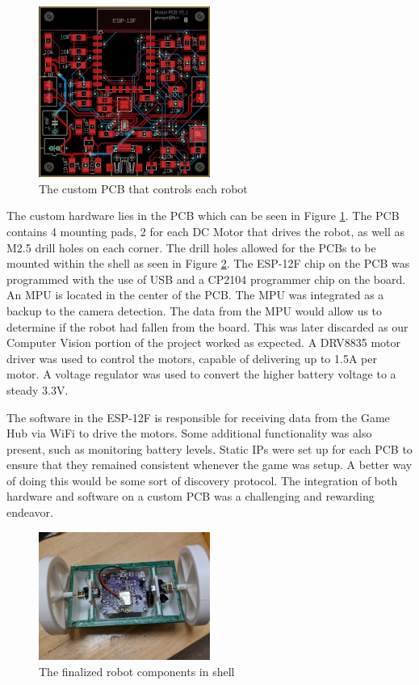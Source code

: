 \documentclass[11pt]{ieeeconf}
\begin{document}
\begin{figure}[H]
\centering
\captionsetup{justification=centering}
\includegraphics[width=0.5\textwidth]{images/FinalPCB.jpg}
\caption{The custom PCB that controls each robot}
\label{PCB}
\end{figure}

The custom hardware lies in the PCB which can be seen in Figure \ref{PCB}. The PCB contains 4 mounting pads, 2 for each DC Motor that drives the robot, as well as M2.5 drill holes on each corner. The drill holes allowed for the PCBs to be mounted within the shell as seen in Figure \ref{robot}. The ESP-12F chip on the PCB was programmed with the use of USB and a CP2104 programmer chip on the board. An MPU is located in the center of the PCB. The MPU was integrated as a backup to the camera detection. The data from the MPU would allow us to determine if the robot had fallen from the board. This was later discarded as our Computer Vision portion of the project worked as expected. A DRV8835 motor driver was used to control the motors, capable of delivering up to 1.5A per motor. A voltage regulator was used to convert the higher battery voltage to a steady 3.3V.

The software in the ESP-12F is responsible for receiving data from the Game Hub via WiFi to drive the motors. Some additional functionality was also present, such as monitoring battery levels. Static IPs were set up for each PCB to ensure that they remained consistent whenever the game was setup. A better way of doing this would be some sort of discovery protocol. The integration of both hardware and software on a custom PCB was a challenging and rewarding endeavor. 

\begin{figure}[H]
\centering
\captionsetup{justification=centering}
\includegraphics[width=0.5\textwidth]{images/FinalRobot.jpg}
\caption{The finalized robot components in shell}
\label{robot}
\end{figure}
\end{document}
